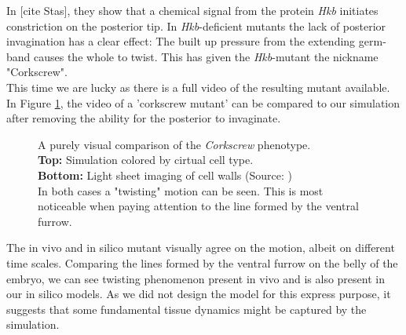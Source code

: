 In [cite Stas], they show that a chemical signal from the protein \textit{Hkb} initiates constriction on the posterior tip. In \textit{Hkb}-deficient mutants the lack of posterior invagination has a clear effect: The built up pressure from the extending germ-band causes the whole to twist. This has given the \textit{Hkb}-mutant the nickname "Corkscrew".\\

This time we are lucky as there is a full video of the resulting mutant available. In Figure \ref{fig:corkscrew-comparison}, the video of a 'corkscrew mutant' can be compared to our simulation after removing the ability for the posterior to invaginate.

 
\begin{figure}[H]
    \centering
    \caption{A purely visual comparison of the \textit{Corkscrew} phenotype.\\
    \textbf{Top:} Simulation colored by cirtual cell type. \\
    \textbf{Bottom:} Light sheet imaging of cell walls (Source: )\\ In both cases  a "twisting" motion can be seen. This is most noticeable when paying attention to the line formed by the ventral furrow.}
    \label{fig:corkscrew-comparison}
\end{figure}

 The in vivo and in silico mutant visually agree on the motion, albeit on different time scales. Comparing the lines formed by the ventral furrow on the belly of the embryo, we can see twisting phenomenon present in vivo and is also present in our in silico models. As we did not design the model for this express purpose, it suggests that some fundamental tissue dynamics might be captured by the simulation. \\


